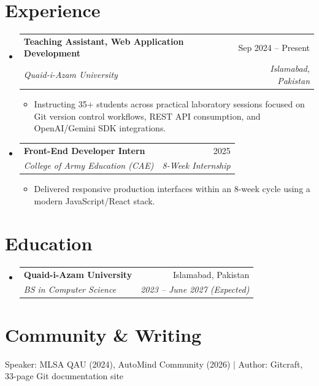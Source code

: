 \documentclass[letterpaper,11pt]{article}
\makeatletter
\newcommand{\resumeItem}[1]{
  \item\small{
    {#1 \vspace{-2pt}}
  }
}
\newcommand{\resumeSubheading}[4]{
  \vspace{-2pt}\item
    \begin{tabular*}{0.97\textwidth}[t]{l@{\extracolsep{\fill}}r}
      \textbf{#1} & #2 \\
      \textit{\small#3} & \textit{\small #4} \\
    \end{tabular*}\vspace{-7pt}
}
\newcommand{\resumeSubHeadingListStart}{\begin{itemize}[leftmargin=0.15in, label={}]}
\newcommand{\resumeSubHeadingListEnd}{\end{itemize}}
\newcommand{\resumeItemListStart}{\begin{itemize}}
\newcommand{\resumeItemListEnd}{\end{itemize}\vspace{-5pt}}
\makeatother
\begin{document}
\section{Experience}
  \resumeSubHeadingListStart

    \resumeSubheading
      {Teaching Assistant, Web Application Development}{Sep 2024 -- Present}
      {Quaid-i-Azam University}{Islamabad, Pakistan}
      \resumeItemListStart
        \resumeItem{Instructing 35+ students across practical laboratory sessions focused on Git version control workflows, REST API consumption, and OpenAI/Gemini SDK integrations.}
      \resumeItemListEnd

    \resumeSubheading
      {Front-End Developer Intern}{2025}
      {College of Army Education (CAE)}{8-Week Internship}
      \resumeItemListStart
        \resumeItem{Delivered responsive production interfaces within an 8-week cycle using a modern JavaScript/React stack.}
      \resumeItemListEnd

  \resumeSubHeadingListEnd


\section{Education}
  \resumeSubHeadingListStart
    \resumeSubheading
      {Quaid-i-Azam University}{Islamabad, Pakistan}
      {BS in Computer Science}{2023 -- June 2027 (Expected)}
  \resumeSubHeadingListEnd

\section{Community \& Writing}
 \begin{itemize}[leftmargin=0.15in, label={}]
    \small{\item{
     Speaker: MLSA QAU (2024), AutoMind Community (2026) $|$ Author: Gitcraft, 33-page Git documentation site
    }}
 \end{itemize}


\end{document}
